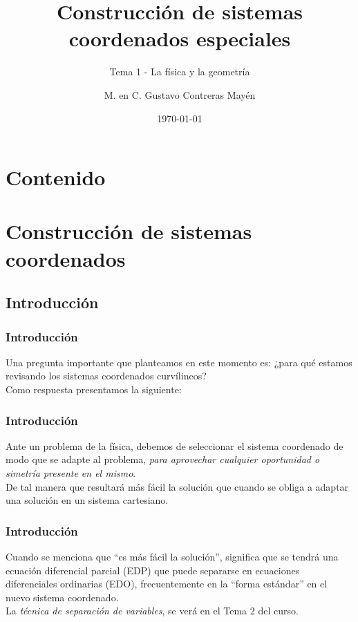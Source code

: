 
\title{\large{Construcción de sistemas coordenados especiales}}
\subtitle{Tema 1 - La física y la geometría}
\author{M. en C. Gustavo Contreras Mayén}
\date{\today}

\maketitle
\fontsize{14}{14}\selectfont
{}
\section*{Contenido}
\section{Construcción de sistemas coordenados}
\subsection{Introducción}
\begin{frame}
\frametitle{Introducción}
Una pregunta importante que planteamos en este momento es: ¿para qué estamos revisando los sistemas coordenados curvílineos?
\\
\bigskip
\pause
Como respuesta presentamos la siguiente:
\end{frame}
\begin{frame}
\frametitle{Introducción}
Ante un problema de la física, debemos de seleccionar el sistema coordenado de modo que se adapte al problema, \emph{para aprovechar cualquier oportunidad o simetría presente en el mismo}.
\\
\bigskip
\pause
De tal manera que resultará más fácil la solución que cuando se obliga a adaptar una solución en un sistema cartesiano.
\end{frame}
\begin{frame}
\frametitle{Introducción}
Cuando se menciona que \enquote{es más fácil la solución}, significa que se tendrá una ecuación diferencial parcial (EDP) que puede separarse en ecuaciones diferenciales ordinarias (EDO), frecuentemente en la \enquote{forma estándar} en el nuevo sistema coordenado.
\\
\bigskip
\pause
La \emph{técnica de separación de variables}, se verá en el Tema 2 del curso.
\end{frame}
